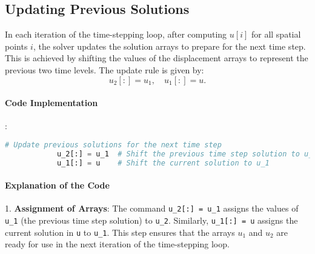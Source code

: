 \documentclass{article}
\begin{document}
		\subsection{Updating Previous Solutions}
		
		In each iteration of the time-stepping loop, after computing \( u[i] \) for all spatial points \( i \), the solver updates the solution arrays to prepare for the next time step. This is achieved by shifting the values of the displacement arrays to represent the previous two time levels. The update rule is given by:
		\[
		u_2[:] = u_1, \quad u_1[:] = u.
		\]
		
		\begin{comment}
		
		\paragraph{Purpose of Updating Arrays}
		
		In finite difference methods for solving wave equations, each time step depends on values from the previous two time levels. By updating the arrays as shown:
		- \( u_2 \) holds the values from two time steps ago,
		- \( u_1 \) holds the values from the previous time step, and
		- \( u \) contains the values from the current time step.
		
		This organization ensures that the solver has access to the necessary time levels for calculating the next time step, maintaining consistency in the time-stepping scheme.
			
		\end{comment}
		
		\paragraph{Code Implementation}
		:
		\begin{lstlisting}[language=Python]
			# Update previous solutions for the next time step
			u_2[:] = u_1  # Shift the previous time step solution to u_2
			u_1[:] = u    # Shift the current solution to u_1
		\end{lstlisting}
		
		\paragraph{Explanation of the Code}
		
		1. \textbf{Assignment of Arrays}: The command \texttt{u\_2[:] = u\_1} assigns the values of \texttt{u\_1} (the previous time step solution) to \texttt{u\_2}. Similarly, \texttt{u\_1[:] = u} assigns the current solution in \texttt{u} to \texttt{u\_1}. This step ensures that the arrays \( u_1 \) and \( u_2 \) are ready for use in the next iteration of the time-stepping loop.
		
\end{document}

